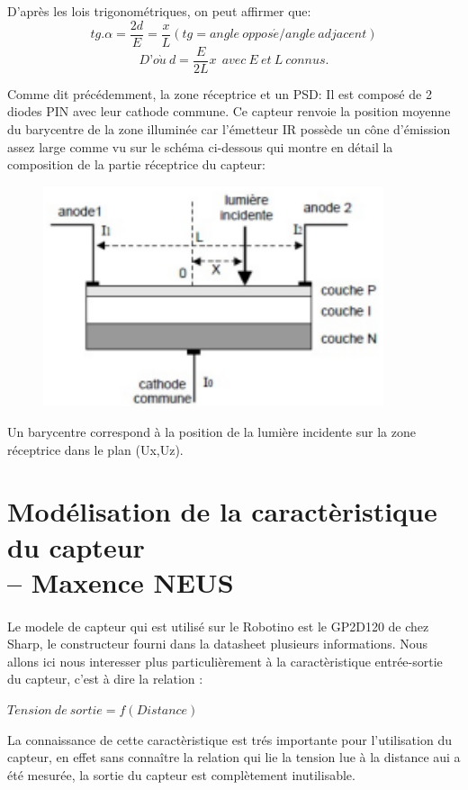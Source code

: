 \documentclass[oneside,a4paper,12pt]{article}
\begin{document}
	D’après les lois trigonométriques, on peut affirmer que:\\
	$$ tg . \alpha = \frac{2d}{E} = \frac{x}{L} (tg = angle\ oppos\acute{e}/angle\ adjacent)$$ 
	$$ D’o\grave{u}\ d = \frac{E}{2L}x \ \  avec\ E\ et\ L\ connus. $$
	
	Comme dit précédemment, la zone réceptrice et un PSD: Il est composé de 2 diodes PIN avec leur cathode commune. Ce capteur renvoie la position moyenne du barycentre de la zone illuminée car l'émetteur IR possède un cône d’émission assez large comme vu sur le schéma ci-dessous qui montre en détail la composition de la partie réceptrice du capteur:\\

	\begin{figure}[h]
		\centering
		\includegraphics[width=10cm]{img5.png}
	\end{figure} 
	
	Un barycentre correspond à la position de la lumière incidente sur la zone réceptrice dans le plan (Ux,Uz).\\
	
	
	\section{Modélisation de la caractèristique du capteur\\ -- Maxence NEUS}
	
	\paragraph{}
	Le modele de capteur qui est utilisé sur le Robotino est le GP2D120 de chez Sharp, le constructeur fourni dans la datasheet plusieurs informations. Nous allons ici nous interesser plus particulièrement à la caractèristique entrée-sortie du capteur, c'est à dire la relation :
	\begin{center}
		${Tension\ de\ sortie = f(Distance)}$
	\end{center}
	La connaissance de cette caractèristique est trés importante pour l'utilisation du capteur, en effet sans connaître la relation qui lie la tension lue à la distance aui a été mesurée, la sortie du capteur est complètement inutilisable.\\
	
\end{document}
